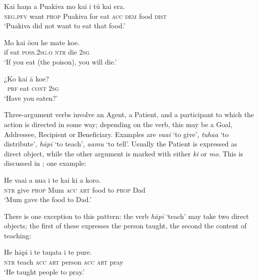 \ea\label{ex:3.84}
\gll Kai haŋa a Puakiva mo kai i tū kai era. \\
\textsc{neg.pfv} want \textsc{prop} Puakiva for eat \textsc{acc} \textsc{dem} food \textsc{dist} \\

\glt 
‘Puakiva did not want to eat that food.’ \textstyleExampleref{[R229.145]} 
\z

\ea\label{ex:3.85}
\gll Mo kai ō{\ꞌ}ou he mate koe. \\
if eat \textsc{poss.2sg.o} \textsc{ntr} die \textsc{2sg} \\

\glt 
‘If you eat (the poison), you will die.’ \textstyleExampleref{[R310.063]} 
\z

\ea\label{ex:3.86}
\gll ¿Ko kai {\ꞌ}ā koe? \\
~\textsc{prf} eat \textsc{cont} \textsc{2sg} \\

\glt 
‘Have you eaten?’ \textstyleExampleref{[R245.058]} 
\z

Three-argument verbs involve an Agent, a Patient, and a participant to which the action is directed in some way; depending on the verb, this may be a Goal, Addressee, Recipient or Beneficiary. Examples are \textit{va{\ꞌ}ai} ‘to give’, \textit{tuha{\ꞌ}a} ‘to distribute’, \textit{hāpī} ‘to teach’, \textit{\mbox{{\ꞌ}a{\ꞌ}amu}} ‘to tell’. Usually the Patient is expressed as direct object, while the other argument is marked with either \textit{ki} or \textit{mo}. This is discussed in ; one example:

\ea\label{ex:3.87}
\gll He va{\ꞌ}ai a nua i te kai ki a koro. \\
\textsc{ntr} give \textsc{prop} Mum \textsc{acc} \textsc{art} food to \textsc{prop} Dad \\

\glt
‘Mum gave the food to Dad.’ \textstyleExampleref{[R236.078]} 
\z

There is one exception to this pattern: the verb \textit{hāpī} ‘teach’ may take two direct objects; the first of these expresses the person taught, the second the content of teaching:

\ea\label{ex:3.88}
\gll He hāpī i te taŋata i te pure.\\
\textsc{ntr} teach \textsc{acc} \textsc{art} person \textsc{acc} \textsc{art} pray\\

\glt
‘He taught people to pray.’ \textstyleExampleref{[R231.304]} 
\z

